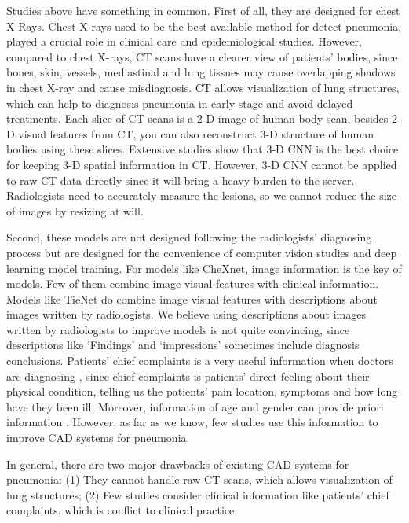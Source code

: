 Studies above have something in common. First of all, they are designed for chest X-Rays. Chest X-rays used to be the best available method for detect pneumonia, played a crucial role in clinical care\cite{Franquet2001Imaging} and epidemiological studies\cite{Thomas2005Standardized}. However, compared to chest X-rays, CT scans have a clearer view of patients' bodies, since bones, skin, vessels, mediastinal and lung tissues may cause overlapping shadows in chest X-ray and cause misdiagnosis. CT allows visualization of lung structures\cite{korfiatis2009texture}, which can help to diagnosis pneumonia in early stage and avoid delayed treatments.
Each slice of CT scans is a 2-D image of human body scan, besides 2-D visual features from CT, you can also reconstruct 3-D structure of human bodies using these slices. Extensive studies show that 3-D CNN is the best choice for keeping 3-D spatial information in CT\cite{Yorozu1987Electron}. However, 3-D CNN cannot be applied to raw CT data directly since it will bring a heavy burden to the server. Radiologists need to accurately measure the lesions, so we cannot reduce the size of images by resizing at will.
 
Second, these models are not designed following the radiologists' diagnosing process but are designed for the convenience of computer vision studies and deep learning model training. For models like CheXnet, image information is the key of models. Few of them combine image visual features with clinical information. Models like TieNet do combine image visual features with descriptions about images written by radiologists. We believe using descriptions about images written by radiologists to improve models is not quite convincing, since descriptions like `Findings' and `impressions' sometimes include diagnosis conclusions.
Patients' chief complaints is a very useful information when doctors are diagnosing \cite{wu2018master}, since chief complaints is patients' direct feeling about their physical condition, telling us the patients' pain location, symptoms and how long have they been ill. Moreover, information of age and gender can provide priori information\cite{xiaojian2011analysis} \cite{huang2014design}. However, as far as we know, few studies use this information to improve CAD systems for pneumonia. 

In general, there are two major drawbacks of existing CAD systems for pneumonia: (1) They cannot handle raw CT scans, which allows visualization of lung structures; (2) Few studies consider clinical information like patients' chief complaints, which is conflict to clinical practice.

